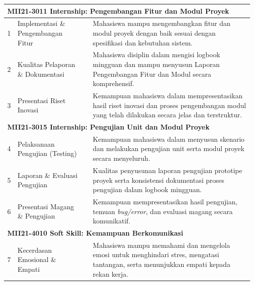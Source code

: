 \begin{longtable}{|c|p{4.5cm}|c|p{6.5cm}|}
	\multicolumn{4}{|l|}{\textbf{MII21-3011 Internship: Pengembangan Fitur dan Modul Proyek}}                                                                                                                                              \\
	\hline
	1            & Implementasi \& Pengembangan Fitur             &                      & Mahasiswa mampu mengembangkan fitur dan modul proyek dengan baik sesuai dengan spesifikasi dan kebutuhan sistem.                                \\
	\hline
	2            & Kualitas Pelaporan \& Dokumentasi              &                      & Mahasiswa disiplin dalam mengisi logbook mingguan dan mampu menyusun Laporan Pengembangan Fitur dan Modul secara komprehensif.                  \\
	\hline
	3            & Presentasi Riset Inovasi                       &                      & Kemampuan mahasiswa dalam mempresentasikan hasil riset inovasi dan proses pengembangan modul yang telah dilakukan secara jelas dan terstruktur. \\
	\hline
	\multicolumn{4}{|l|}{\textbf{MII21-3015 Internship: Pengujian Unit dan Modul Proyek}}                                                                                                                                                  \\
	\hline
	4            & Pelaksanaan Pengujian (Testing)                &                      & Kemampuan mahasiswa dalam menyusun skenario dan melakukan pengujian unit serta modul proyek secara menyeluruh.                                  \\
	\hline
	5            & Laporan \& Evaluasi Pengujian                  &                      & Kualitas penyusunan laporan pengujian prototipe proyek serta konsistensi dokumentasi proses pengujian dalam logbook mingguan.                   \\
	\hline
	6            & Presentasi Magang \& Pengujian                 &                      & Kemampuan mempresentasikan hasil pengujian, temuan \textit{bug/error}, dan evaluasi magang secara komunikatif.                                  \\
	\hline
	\multicolumn{4}{|l|}{\textbf{MII21-4010 Soft Skill: Kemampuan Berkomunikasi}}                                                                                                                                                          \\
	\hline
	7            & Kecerdasan Emosional \& Empati                 &                      & Mahasiswa mampu memahami dan mengelola emosi untuk menghindari stres, mengatasi tantangan, serta menunjukkan empati kepada rekan kerja.         \\

\end{longtable}
